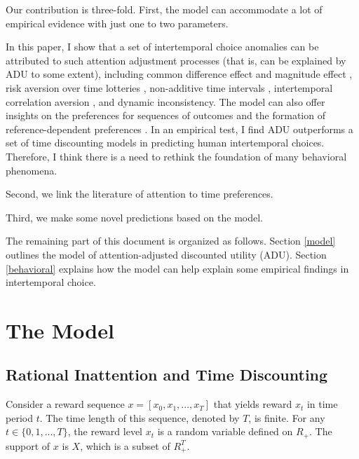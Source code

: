 \documentclass[
  12pt,
]{article}
\begin{document}
Our contribution is three-fold. First, the model can accommodate a lot
of empirical evidence with just one to two parameters.

In this paper, I show that a set of intertemporal choice anomalies can
be attributed to such attention adjustment processes (that is, can be
explained by ADU to some extent), including common difference effect and
magnitude effect \citep{loewenstein_anomalies_1992}, risk aversion over
time lotteries \citep{onay_intertemporal_2007, dejarnette_time_2020},
non-additive time intervals
\citep{read_is_2001, scholten_discounting_2006}, intertemporal
correlation aversion \citep{andersen_multiattribute_2018}, and dynamic
inconsistency. The model can also offer insights on the preferences for
sequences of outcomes \citep{loewenstein_preferences_1993} and the
formation of reference-dependent preferences \citep{koszegi_model_2006}.
In an empirical test, I find ADU outperforms a set of time discounting
models in predicting human intertemporal choices. Therefore, I think
there is a need to rethink the foundation of many behavioral phenomena.

Second, we link the literature of attention to time preferences.

Third, we make some novel predictions based on the model.

The remaining part of this document is organized as follows. Section
\ref{model} outlines the model of attention-adjusted discounted utility
(ADU). Section \ref{behavioral} explains how the model can help explain
some empirical findings in intertemporal choice.

\hypertarget{the-model}{%
\section{\texorpdfstring{The Model
\label{model}}{The Model }}\label{the-model}}

\hypertarget{rational-inattention-and-time-discounting}{%
\subsection{Rational Inattention and Time
Discounting}\label{rational-inattention-and-time-discounting}}

Consider a reward sequence \(x = [x_0,x_1,...,x_T]\) that yields reward
\(x_t\) in time period \(t\). The time length of this sequence, denoted
by \(T\), is finite. For any \(t \in \{0,1,...,T\}\), the reward level
\(x_t\) is a random variable defined on \(R_{+}\). The support of \(x\)
is \(X\), which is a subset of \(R_{+}^T\).
\end{document}
